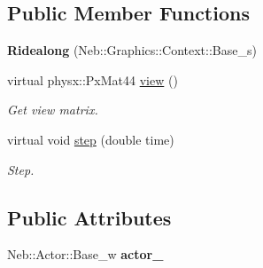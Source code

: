 \subsection*{\-Public \-Member \-Functions}
\begin{DoxyCompactItemize}
\item 
\hypertarget{classNeb_1_1Graphics_1_1Camera_1_1View_1_1Ridealong_a50ee0e831b20ab8b6bbac5c3a9ed809a}{{\bfseries \-Ridealong} (\-Neb\-::\-Graphics\-::\-Context\-::\-Base\-\_\-s)}\label{classNeb_1_1Graphics_1_1Camera_1_1View_1_1Ridealong_a50ee0e831b20ab8b6bbac5c3a9ed809a}

\item 
\hypertarget{classNeb_1_1Graphics_1_1Camera_1_1View_1_1Ridealong_a15ae9ffd6272a10ecd5509588220d1ea}{virtual physx\-::\-Px\-Mat44 \hyperlink{classNeb_1_1Graphics_1_1Camera_1_1View_1_1Ridealong_a15ae9ffd6272a10ecd5509588220d1ea}{view} ()}\label{classNeb_1_1Graphics_1_1Camera_1_1View_1_1Ridealong_a15ae9ffd6272a10ecd5509588220d1ea}

\begin{DoxyCompactList}\small\item\em \-Get view matrix. \end{DoxyCompactList}\item 
virtual void \hyperlink{classNeb_1_1Graphics_1_1Camera_1_1View_1_1Ridealong_ad78d68a7381289731d6f066f4f7e1e8d}{step} (double time)
\begin{DoxyCompactList}\small\item\em \-Step. \end{DoxyCompactList}\end{DoxyCompactItemize}
\subsection*{\-Public \-Attributes}
\begin{DoxyCompactItemize}
\item 
\hypertarget{classNeb_1_1Graphics_1_1Camera_1_1View_1_1Ridealong_a9671d8142e3bb18114e0e5c4677e3815}{\-Neb\-::\-Actor\-::\-Base\-\_\-w {\bfseries actor\-\_\-}}\label{classNeb_1_1Graphics_1_1Camera_1_1View_1_1Ridealong_a9671d8142e3bb18114e0e5c4677e3815}

\end{DoxyCompactItemize}


